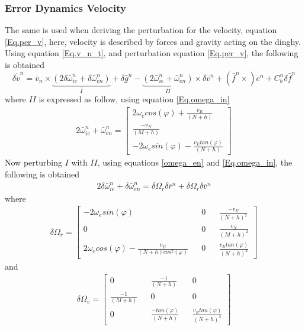 \subsubsection{Error Dynamics Velocity}
The same is used when deriving the perturbation for the velocity, equation \eqref{Eq.per_v}, here, velocity is described by forces and gravity acting on the dinghy. Using equation \eqref{Eq.v_n_t}, and perturbation equation \eqref{Eq.per_v}, the following is obtained\cite{nonlinear}
\begin{equation}
\delta \dot{\bar{v}}^n = \bar{v}_n \times \underbrace{(2\delta \bar{\omega}_{ie}^n+ \delta \bar{\omega}_{en}^n)}_{I}+\delta \bar{g}^n -\underbrace{(2\bar{\omega}_{ie}^n + \bar{\omega}_{en}^n)}_{II}\times \delta \bar{v}^n + (\bar{f}^n\times) e^n +C_b^n\delta \bar{f}^n
\label{Eq.delta_v}
\end{equation}
where $II$ is expressed as follow, using equation \eqref{Eq.omega_in}
\begin{align}
2\bar{\omega}_{ie}^n + \bar{\omega}_{en}^n = 
\begin{bmatrix}
2\omega_e cos(\varphi) + \frac{v_E}{(N+h)} \\
\frac{-v_N}{(M+h)} \\
-2\omega_e sin(\varphi) - \frac{v_E tan(\varphi)}{(N+h)}
\end{bmatrix}
\label{Eq.II}
\end{align}
Now perturbing $I$ with $II$, using equations \eqref{omega_en} and \eqref{Eq.omega_in}, the following is obtained
\begin{align}
2\delta \bar{\omega}_{ie}^n+ \delta \bar{\omega}_{en}^n =
\delta \Omega_r\delta \bar{r}^n + \delta\Omega_r\delta\bar{v}^n
\end{align}
where
\begin{align}
\delta\Omega_r = 
\begin{bmatrix}
-2 \omega_e sin(\varphi) && 0 && \frac{-v_E}{(N+h)^2}\\
0 && 0 && \frac{v_N}{(M+h)^2}\\
2 \omega_e cos(\varphi)-\frac{v_E}{(N+h)cos^2(\varphi)} && 0 && \frac{v_E tan(\varphi)}{(N+h)^2}
\end{bmatrix}
\label{Eq.Omega_r}
\end{align}
and
\begin{align}
\delta\Omega_v = 
\begin{bmatrix}
0 &&  \frac{-1}{(N+h)} && 0\\
\frac{-1}{(M+h)} && 0 && 0\\
0 && \frac{-tan(\varphi)}{(N+h)} && \frac{v_E tan(\varphi)}{(N+h)^2}
\end{bmatrix}
\label{Eq.Omega_v}
\end{align}
